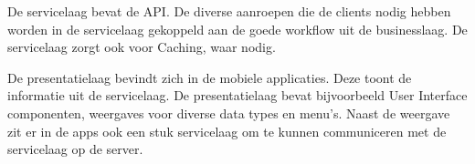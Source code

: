 De servicelaag bevat de API. De diverse aanroepen die de clients nodig hebben
worden in de servicelaag gekoppeld aan de goede workflow uit de businesslaag. De
servicelaag zorgt ook voor Caching, waar nodig.

De presentatielaag bevindt zich in de mobiele applicaties. Deze toont de informatie uit de
servicelaag. De presentatielaag bevat bijvoorbeeld User Interface componenten, 
weergaves voor diverse data types en menu's. Naast de weergave zit er in de apps 
ook een stuk servicelaag om te kunnen communiceren met de servicelaag op de 
server.